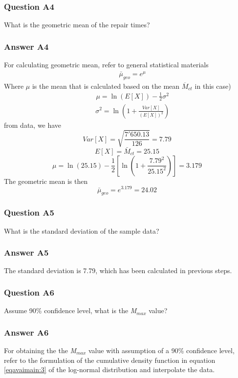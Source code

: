 \subsubsection{Question A4}
What is the geometric mean of the repair times?
\subsubsection{Answer A4}
For calculating geometric mean, refer to general statistical materials
\begin{eqnarray}
&& {\bar \mu _{geo}} = {e^\mu }
\label{eqavaimai:5}
\end{eqnarray}
Where $\mu{}$ is the mean that is calculated based on the mean ${\overline M _{ct}}$ in this case)
\begin{eqnarray}
&& \mu  = \ln (E\left[ X \right]) - \frac{1}{2}{\sigma ^2} \label{eqavaimai:6}
\end{eqnarray}
\begin{eqnarray}
&& {\sigma ^2} = \ln \left( {1 + \frac{{Var\left[ X \right]}}{{{{(E\left[ X \right])}^2}}}} \right)
\end{eqnarray}
from data, we have
\[
Var\left[ X \right] = \sqrt {\frac{{7'650.13}}{{126}}}  = 7.79
\]
\[
E\left[ X \right] = {\bar M_{ct}} = 25.15
\]
\[
\mu  = \ln (25.15) - \frac{1}{2}\left[ {\ln \left( {1 +
\frac{{{{7.79}^2}}}{{{{25.15}^2}}}} \right)} \right] = 3.179
\]
The geometric mean is then
\[
{\bar \mu _{geo}} = {e^{3.179}} = 24.02
\]
\subsubsection{Question A5}
What is the standard deviation of the sample data?
\subsubsection{Answer A5}
The standard deviation is 7.79, which has been calculated in previous
steps.
\subsubsection{Question A6}
Assume 90\% confidence level, what is the \textit{M$_{max}$} value?
\subsubsection{Answer A6}
For obtaining the the \textit{M$_{max}$} value with assumption of a 90\%
confidence level, refer to the formulation of the cumulative density function in
equation \eqref{eqavaimain:3} of the log-normal distribution and interpolate the data.

